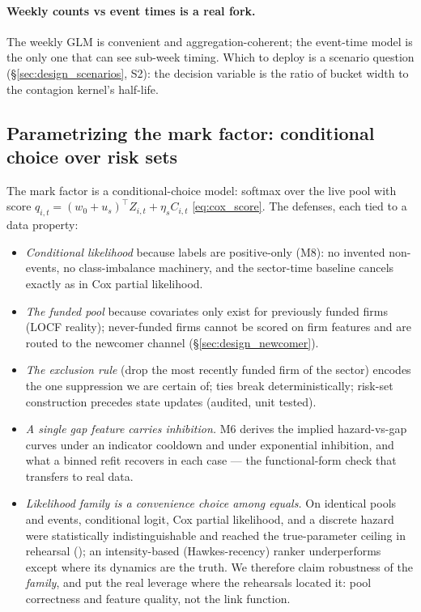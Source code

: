 \paragraph{Weekly counts vs event times is a real fork.} The weekly GLM is
convenient and aggregation-coherent; the event-time model is the only one that
can see sub-week timing. Which to deploy is a scenario question
(\S\ref{sec:design_scenarios}, S2): the decision variable is the ratio of
bucket width to the contagion kernel's half-life.

\subsection{Parametrizing the mark factor: conditional choice over risk sets}
\label{sec:design_mark}

The mark factor is a conditional-choice model: softmax over the live pool with
score $q_{i,t}=(w_0+u_s)^\top Z_{i,t}+\eta_s C_{i,t}$
\eqref{eq:cox_score}. The defenses, each tied to a data property:

\begin{itemize}[leftmargin=1.6em]
\item \emph{Conditional likelihood} because labels are positive-only (M8): no
invented non-events, no class-imbalance machinery, and the sector-time baseline
cancels exactly as in Cox partial likelihood.
\item \emph{The funded pool} because covariates only exist for previously
funded firms (LOCF reality); never-funded firms cannot be scored on firm
features and are routed to the newcomer channel
(\S\ref{sec:design_newcomer}).
\item \emph{The exclusion rule} (drop the most recently funded firm of the
sector) encodes the one suppression we are certain of; ties break
deterministically; risk-set construction precedes state updates (audited, unit
tested).
\item \emph{A single gap feature carries inhibition.} M6 derives the implied
hazard-vs-gap curves under an indicator cooldown and under exponential
inhibition, and what a binned refit recovers in each case --- the
functional-form check that transfers to real data.
\item \emph{Likelihood family is a convenience choice among equals.} On
identical pools and events, conditional logit, Cox partial likelihood, and a
discrete hazard were statistically indistinguishable and reached the
true-parameter ceiling in rehearsal (); an intensity-based
(Hawkes-recency) ranker underperforms except where its dynamics are the truth.
We therefore claim robustness of the \emph{family}, and put the real leverage
where the rehearsals located it: pool correctness and feature quality, not the
link function.
\end{itemize}

